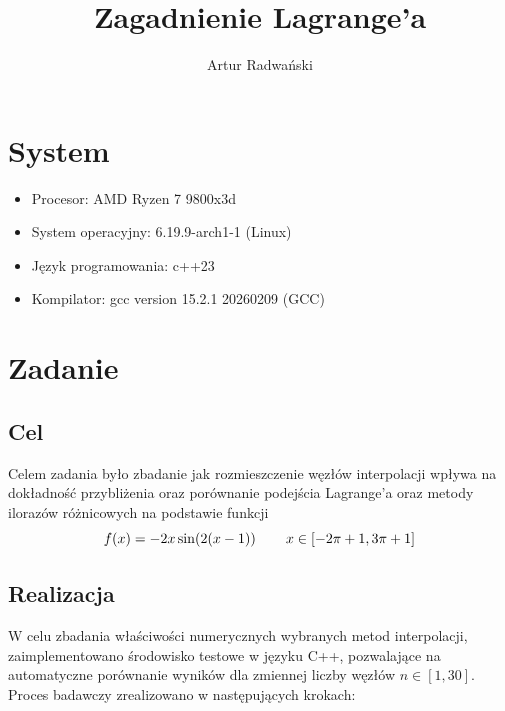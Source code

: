 \documentclass{article}
\author{Artur Radwański}
\title{Zagadnienie Lagrange'a}
\begin{document}
\maketitle
% 
% 


\linespread{1.3}
\selectfont

\section{System}
\begin{itemize}
    \item Procesor: AMD Ryzen 7 9800x3d
    \item System operacyjny: 6.19.9-arch1-1 (Linux)
    \item Język programowania: c++23
    \item Kompilator: gcc version 15.2.1 20260209 (GCC) 
\end{itemize}

\section{Zadanie}
\subsection{Cel}
Celem zadania było zbadanie jak rozmieszczenie węzłów interpolacji wpływa na dokładność przybliżenia oraz porównanie podejścia Lagrange'a oraz metody ilorazów różnicowych
na podstawie funkcji 
    \[f(x) = -2x\sin(2(x-1))\hspace{5ex}  x\in[-2\pi+1,3\pi+1]\]

\subsection{Realizacja}

W celu zbadania właściwości numerycznych wybranych metod interpolacji, zaimplementowano środowisko testowe w języku C++, pozwalające na automatyczne porównanie wyników dla zmiennej liczby węzłów $n \in [1, 30]$. Proces badawczy zrealizowano w następujących krokach:
\end{document}
